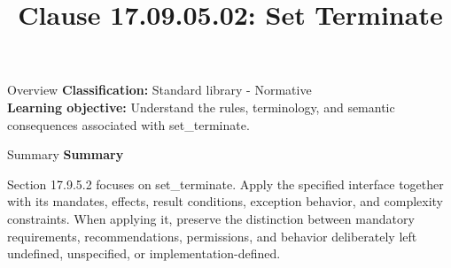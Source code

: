 \documentclass[10pt,letterpaper]{article}
\title{Clause 17.09.05.02: Set Terminate}
\author{}
\date{}
\begin{document}
\maketitle
\begin{CornellOverviewBox}{Overview}
\textbf{Classification:} Standard library - Normative\\[2pt]
\textbf{Learning objective:} Understand the rules, terminology, and semantic consequences associated with set\_terminate.
\end{CornellOverviewBox}\begin{CornellSummaryBox}{Summary}
{\sffamily\bfseries\color{Accent} Summary}\par\vspace{3pt}Section 17.9.5.2 focuses on set\_terminate. Apply the specified interface together with its mandates, effects, result conditions, exception behavior, and complexity constraints. When applying it, preserve the distinction between mandatory requirements, recommendations, permissions, and behavior deliberately left undefined, unspecified, or implementation-defined.
\end{CornellSummaryBox}
\end{document}
